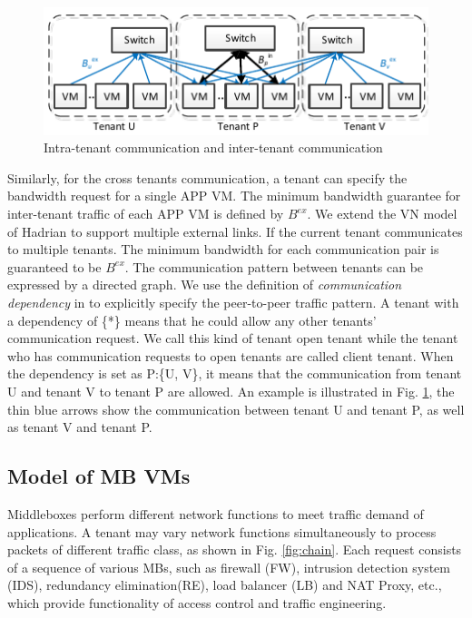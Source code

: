 \documentclass[review]{elsarticle}
\begin{document}
\begin{figure}
	\centering
		\includegraphics[width=3.5 in]{fig/tagmodel.pdf}
	\caption{Intra-tenant communication and inter-tenant communication}
	\label{fig:hose}
\end{figure}

Similarly, for the cross tenants communication, a tenant can specify the bandwidth request for a single APP VM. The minimum bandwidth guarantee for inter-tenant traffic of each APP VM is defined by $B^{ex}$. We extend the VN model of Hadrian \cite{B13cta} to support multiple external links. If the current tenant communicates to multiple tenants. The minimum bandwidth for each communication pair is guaranteed to be $B^{ex}$. The communication pattern between tenants can be expressed by a directed graph. We use the definition of \emph{communication dependency} in \cite{B13cta} to explicitly specify the peer-to-peer traffic pattern. A tenant with a dependency of \{*\} means that he could allow any other tenants' communication request. We call this kind of tenant open tenant while the tenant who has communication requests to open tenants are called client tenant. When the dependency is set as P:\{U, V\}, it means that the communication from tenant U and tenant V to tenant P are allowed. An example is illustrated in Fig. \ref{fig:hose}, the thin blue arrows show the communication between tenant U and tenant P, as well as tenant V and tenant P.




\subsection{Model of MB VMs}\label{sec:modelformb}

Middleboxes perform different network functions to meet traffic demand of applications. A tenant may vary network functions simultaneously to process packets of different traffic class, as shown in Fig. \ref{fig:chain}. Each request consists of a sequence of various MBs, such as firewall (FW), intrusion detection system (IDS), redundancy elimination(RE), load balancer (LB) and NAT Proxy, etc., which provide functionality of access control and traffic engineering. 
\end{document}
